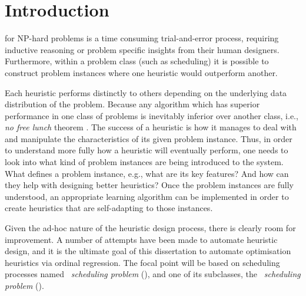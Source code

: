 
\chapter{Introduction}\label{ch:introduction} 

 for NP-hard problems is a time 
consuming trial-and-error process, requiring inductive reasoning or problem 
specific insights from their human designers. Furthermore, within a problem 
class (such as scheduling) it is possible to construct problem instances where 
one heuristic would outperform another. 

Each heuristic performs distinctly to others depending on the underlying data 
distribution of the problem. Because any algorithm which 
has superior performance in one class of problems is inevitably inferior over 
another class, i.e., \emph{no free lunch} theorem \citep{Wolpert97nofree}. 
The success of a heuristic is how it manages to deal with and manipulate the 
characteristics of its given problem instance. Thus, in order to understand 
more fully how a heuristic will eventually perform, one needs to look into what 
kind of problem instances are being introduced to the system. What defines a 
problem instance, e.g., what are its key features? And how can they help with 
designing better heuristics? Once the problem instances are fully understood, 
an appropriate learning algorithm can be implemented in order to create 
heuristics that are  self-adapting to those instances.

Given the ad-hoc nature of the heuristic design process, there is clearly room 
for improvement. A number of attempts have been made to automate heuristic 
design, and it is the ultimate goal of this dissertation to automate 
optimisation heuristics via ordinal regression. 
The focal point will be based on scheduling processes named \emph{\jsp\ 
scheduling problem} (\JSP), and one of its subclasses, the \emph{\fsp\ 
scheduling problem} (\FSP).

